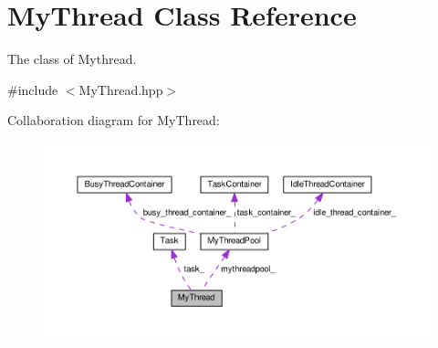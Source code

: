 \hypertarget{classMyThread}{}\section{My\+Thread Class Reference}
\label{classMyThread}


The class of Mythread.  




{\ttfamily \#include $<$My\+Thread.\+hpp$>$}



Collaboration diagram for My\+Thread\+:\nopagebreak
\begin{figure}[H]
\begin{center}
\leavevmode
\includegraphics[width=350pt]{classMyThread__coll__graph}
\end{center}
\end{figure}
